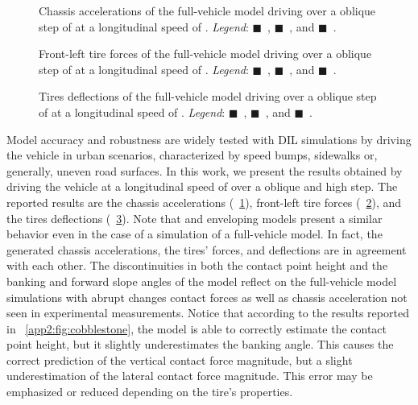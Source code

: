 \begin{figure}[!htb]
  \centering
  \caption{Chassis accelerations of the full-vehicle model driving over a  oblique step of  at a longitudinal speed of . \emph{Legend}:
  {\color{mycolor1}$\blacksquare$}~\Enve{}, {\color{mycolor2}$\blacksquare$}~\Swift{}, and {\color{mycolor3}$\blacksquare$}~\TMEasy{}.}
  \label{app2:fig:accelerations}
\end{figure}

\begin{figure}[!htb]
  \centering
  \caption{Front-left tire forces of the full-vehicle model driving over a  oblique step of  at a longitudinal speed of . \emph{Legend}: {\color{mycolor1}$\blacksquare$}~\Enve{}, {\color{mycolor2}$\blacksquare$}~\Swift{}, and {\color{mycolor3}$\blacksquare$}~\TMEasy{}.}
  \label{app2:fig:forces}
\end{figure}

\begin{figure}[!htb]
  \centering
  \caption{Tires deflections of the full-vehicle model driving over a  oblique step of  at a longitudinal speed of . \emph{Legend}: {\color{mycolor1}$\blacksquare$}~\Enve{}, {\color{mycolor2}$\blacksquare$}~\Swift{}, and {\color{mycolor3}$\blacksquare$}~\TMEasy{}.}
  \label{app2:fig:rho}
\end{figure}

Model accuracy and robustness are widely tested with DIL simulations by driving the vehicle in urban scenarios, characterized by speed bumps, sidewalks or, generally, uneven road surfaces. In this work, we present the results obtained by driving the vehicle at a longitudinal speed of  over a  oblique and  high step. The reported results are the chassis accelerations (\figurename{}~\ref{app2:fig:accelerations}), front-left tire forces (\figurename{}~\ref{app2:fig:forces}), and the tires deflections (\figurename{}~\ref{app2:fig:rho}). Note that \Enve{} and \Swift{} enveloping models present a similar behavior even in the case of a simulation of a full-vehicle model. In fact, the generated chassis accelerations, the tires' forces, and deflections are in agreement with each other. The discontinuities in both the contact point height and the banking and forward slope angles of the \TMEasy{} model reflect on the full-vehicle model simulations with abrupt changes contact forces as well as chassis acceleration not seen in experimental measurements. Notice that according to the results reported in \figurename{}~\ref{app2:fig:cobblestone}, the \Enve{} model is able to correctly estimate the contact point height, but it slightly underestimates the banking angle. This causes the correct prediction of the vertical contact force magnitude, but a slight underestimation of the lateral contact force magnitude. This error may be emphasized or reduced depending on the tire's properties.

